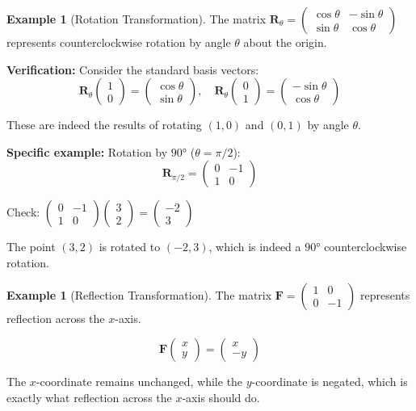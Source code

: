 \documentclass[12pt]{article}
\numberwithin{equation}{section}
\newcommand{\mat}[1]{\mathbf{#1}}        %
\theoremstyle{plain}
\theoremstyle{definition}
\newtheorem{example}[theorem]{Example}
\theoremstyle{remark}
\begin{document}
\begin{example}[Rotation Transformation]
The matrix $\mat{R}_{\theta} = \begin{pmatrix} \cos\theta & -\sin\theta \\ \sin\theta & \cos\theta \end{pmatrix}$ represents counterclockwise rotation by angle $\theta$ about the origin.

\textbf{Verification:} Consider the standard basis vectors:
$$\mat{R}_{\theta}\begin{pmatrix} 1 \\ 0 \end{pmatrix} = \begin{pmatrix} \cos\theta \\ \sin\theta \end{pmatrix}, \quad \mat{R}_{\theta}\begin{pmatrix} 0 \\ 1 \end{pmatrix} = \begin{pmatrix} -\sin\theta \\ \cos\theta \end{pmatrix}$$

These are indeed the results of rotating $(1,0)$ and $(0,1)$ by angle $\theta$.

\textbf{Specific example:} Rotation by $90°$ ($\theta = \pi/2$):
$$\mat{R}_{\pi/2} = \begin{pmatrix} 0 & -1 \\ 1 & 0 \end{pmatrix}$$

Check: $\begin{pmatrix} 0 & -1 \\ 1 & 0 \end{pmatrix}\begin{pmatrix} 3 \\ 2 \end{pmatrix} = \begin{pmatrix} -2 \\ 3 \end{pmatrix}$

The point $(3,2)$ is rotated to $(-2,3)$, which is indeed a $90°$ counterclockwise rotation.
\end{example}

\begin{example}[Reflection Transformation]
The matrix $\mat{F} = \begin{pmatrix} 1 & 0 \\ 0 & -1 \end{pmatrix}$ represents reflection across the $x$-axis.

$$\mat{F}\begin{pmatrix} x \\ y \end{pmatrix} = \begin{pmatrix} x \\ -y \end{pmatrix}$$

The $x$-coordinate remains unchanged, while the $y$-coordinate is negated, which is exactly what reflection across the $x$-axis should do.
\end{example}
\end{document}
